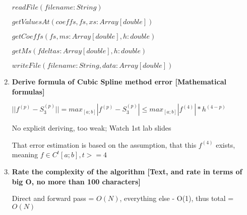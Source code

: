 \documentclass{article}
\begin{document}
\begin{enumerate}
    $ readFile(filename: String)$
    
    $ getValuesAt(coeffs,fs,xs:Array[double])$
    
    $ getCoeffs(fs, ms:Array[double],h:double)$
    
    $ getMs(fdeltas: Array[double],h:double)$
    
    $ writeFile(filename:String, data:Array[double])$
    

    \item \textbf{Derive formula of Cubic Spline method error [Mathematical formulas]}
    
    $|| f^{(p)} - S^{(p)}_3 || = max_{[a;b]}|f^{(p)} - S^{(p)}_3| \le max_{[a;b]}|f^{(4)}|*h^{(4-p)}$ 
    
    No explicit deriving, too weak; Watch 1st lab slides
    
    
    That error estimation is based on the assumption, that this $f^{(4)}$ exists, meaning $f \in C^{t}[a;b], t>=4$
    
    
    \item \textbf{Rate the complexity of the algorithm [Text, and rate in terms of big O, no more than 100 characters]}
    
    Direct and forward pass = $O(N)$, everything else - O(1), thus total = $O(N)$

\end{enumerate}
\end{document}
